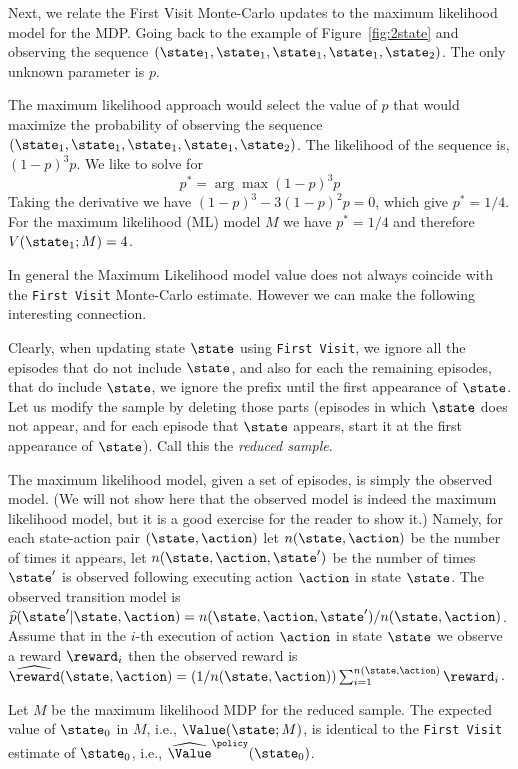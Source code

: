 Next, we relate the First Visit Monte-Carlo updates to the maximum
likelihood model for the MDP. Going back to the example of
Figure~\ref{fig:2state} and observing the sequence
$(\state_1,\state_1,\state_1,\state_1,\state_2)$. The only unknown
parameter is $p$.

The maximum likelihood approach would select the value of $p$ that
would maximize the probability of observing the sequence
$(\state_1,\state_1,\state_1,\state_1,\state_2)$. The likelihood of
the sequence is, $(1-p)^3p$. We like to solve for
\[
p^* = \arg\max (1-p)^3 p
\]
Taking the derivative we have $(1-p)^3-3(1-p)^2p=0$, which give
$p^*=1/4$.
%
For the maximum likelihood (ML) model $M$ we have $p^*=1/4$ and
therefore $V(\state_1;M)=4$.

In general the Maximum Likelihood model value does not always
coincide with the {\tt First Visit} Monte-Carlo estimate. However we
can make the following interesting connection.

Clearly, when updating state $\state$ using {\tt First Visit}, we
ignore all the episodes that do not include $\state$, and also for
each the remaining episodes, that do include $\state$, we ignore the
prefix until the first appearance of $\state$. Let us modify the
sample by deleting those parts (episodes in which $\state$ does not
appear, and for each episode that $\state$ appears, start it at the
first appearance of $\state$). Call this the {\em reduced sample}.

The maximum likelihood model, given a set of episodes, is simply the
observed model. (We will not show here that the observed model is
indeed the maximum likelihood model, but it is a good exercise for the reader to show it.) 
Namely, for each state-action
pair $(\state,\action)$ let $n(\state,\action)$ be the number of
times it appears, let $n(\state,\action,\state')$ be the number of
times $\state'$ is observed following executing action $\action$ in
state $\state$. The observed transition model is
$\widehat{p}(\state'|\state,\action)=n(\state,\action,\state')/n(\state,\action)$.
Assume that in the $i$-th execution of action $\action$ in state
$\state$ we observe a reward $\reward_i$ then the observed reward is
$\widehat{\reward}(\state,\action)=(1/n(\state,\action))\sum_{i=1}^{n(\state,\action)}
\reward_i$.

\begin{theorem}
\label{thm:MC-ML}
%
Let $M$ be the maximum likelihood MDP for the reduced sample. The
expected value of $\state_0$ in $M$, i.e., $\Value(\state;M)$, is
identical to the {\tt First Visit} estimate of $\state_0$, i.e.,
$\widehat{\Value}^\policy(\state_0)$.
\end{theorem}

